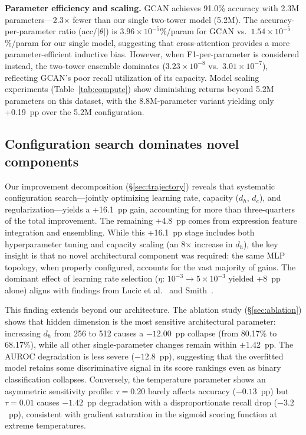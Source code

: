 \documentclass[10pt,twocolumn]{article}
\begin{document}
\textbf{Parameter efficiency and scaling.}
GCAN achieves 91.0\% accuracy with 2.3M parameters---2.3$\times$ fewer than our single two-tower model (5.2M).
The accuracy-per-parameter ratio (acc/$|\theta|$) is $3.96 \times 10^{-5}$\%/param for GCAN vs.\ $1.54 \times 10^{-5}$\%/param for our single model, suggesting that cross-attention provides a more parameter-efficient inductive bias.
However, when F1-per-parameter is considered instead, the two-tower ensemble dominates ($3.23 \times 10^{-8}$ vs.\ $3.01 \times 10^{-7}$), reflecting GCAN's poor recall utilization of its capacity.
Model scaling experiments (Table~\ref{tab:compute}) show diminishing returns beyond 5.2M parameters on this dataset, with the 8.8M-parameter variant yielding only +0.19~pp over the 5.2M configuration.

\subsection{Configuration search dominates novel components}

Our improvement decomposition (\S\ref{sec:trajectory}) reveals that systematic configuration search---jointly optimizing learning rate, capacity ($d_h$, $d_e$), and regularization---yields a +16.1~pp gain, accounting for more than three-quarters of the total improvement.
The remaining +4.8~pp comes from expression feature integration and ensembling.
While this +16.1~pp stage includes both hyperparameter tuning and capacity scaling (an 8$\times$ increase in $d_h$), the key insight is that no novel architectural component was required: the same MLP topology, when properly configured, accounts for the vast majority of gains.
The dominant effect of learning rate selection ($\eta$: $10^{-3} \to 5 \times 10^{-3}$ yielded +8~pp alone) aligns with findings from Lucic et al.~\cite{lucic2018gans} and Smith~\cite{smith2017cyclical}.

This finding extends beyond our architecture.
The ablation study (\S\ref{sec:ablation}) shows that hidden dimension is the most sensitive architectural parameter: increasing $d_h$ from 256 to 512 causes a $-12.00$~pp collapse (from 80.17\% to 68.17\%), while all other single-parameter changes remain within $\pm$1.42~pp.
The AUROC degradation is less severe ($-12.8$~pp), suggesting that the overfitted model retains some discriminative signal in its score rankings even as binary classification collapses.
Conversely, the temperature parameter shows an asymmetric sensitivity profile: $\tau = 0.20$ barely affects accuracy ($-0.13$~pp) but $\tau = 0.01$ causes $-1.42$~pp degradation with a disproportionate recall drop ($-3.2$~pp), consistent with gradient saturation in the sigmoid scoring function at extreme temperatures.
\end{document}
